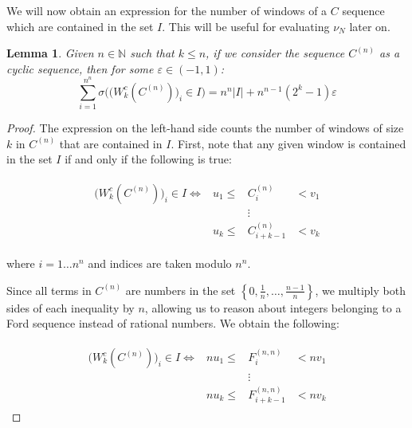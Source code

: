 \documentclass[11pt,a4paper]{tesis}
\theoremstyle{plain}
\newtheorem{lemma}[theorem]{Lemma}
\theoremstyle{definition}
\begin{document}
We will now obtain an expression for the number of windows of a $C$ sequence which are contained in the set $I$. This will be useful for evaluating $\nu_N$ later on.

\begin{lemma}\label{lemma:count-windows-c-sequence-cyclic}
  Given $n \in \mathbb{N}$ such that $k \le n$, if we consider the sequence $C^{(n)}$ as a cyclic sequence, then for some $\varepsilon \in (-1, 1)$:
  \begin{equation*}
    \sum_{i = 1}^{n^n} \sigma\Big( \big( W_k^{c}(C^{(n)}) \big)_i \in I \Big) = n^n |I| + n^{n - 1} (2^k - 1) \varepsilon
  \end{equation*}
\end{lemma}

\begin{proof}
  The expression on the left-hand side counts the number of windows of size $k$ in $C^{(n)}$ that are contained in $I$. First, note that any given window is contained in the set $I$ if and only if the following is true:
  
  \begin{equation*}
    \begin{aligned}
        \begin{array}{cccc}
          \big( W_k^{c}(C^{(n)}) \big)_i \in I \Longleftrightarrow & u_1 \le & C^{(n)}_{i}         & < v_1 \\
                              & & \vdots & \\
                              & u_k \le & C^{(n)}_{i + k - 1} & < v_k
        \end{array}
    \end{aligned}
  \end{equation*}
  
  where $i = 1 \dots n^n$ and indices are taken modulo $n^n$.

   Since all terms in $C^{(n)}$ are numbers in the set $ \left \{ 0, \frac{1}{n}, \dots, \frac{n - 1}{n} \right \}$, we multiply both sides of each inequality by $n$, allowing us to reason about integers belonging to a Ford sequence instead of rational numbers. We obtain the following:

  \begin{equation*}
    \begin{aligned}
        \begin{array}{cccc}
          \big( W_k^{c}(C^{(n)}) \big)_i \in I \Longleftrightarrow & n u_1 \le & F^{(n, n)}_{i}         & < n v_1 \\
                              & & \vdots & \\
                              & n u_k \le & F^{(n, n)}_{i + k - 1} & < n v_k
        \end{array}
    \end{aligned}
  \end{equation*}


\end{proof}
\end{document}
